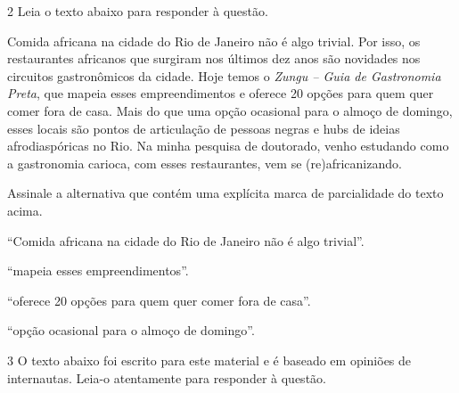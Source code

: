 \num{2} Leia o texto abaixo para responder à questão.

\begin{myquote}
Comida africana na cidade do Rio de Janeiro não é algo trivial. Por isso, os
restaurantes africanos que surgiram nos últimos dez anos são novidades nos
circuitos gastronômicos da cidade. Hoje temos o \textit{Zungu -- Guia de Gastronomia
Preta}, que mapeia esses empreendimentos e oferece 20 opções para quem quer
comer fora de casa. Mais do que uma opção ocasional para o almoço de domingo,
esses locais são pontos de articulação de pessoas negras e hubs de ideias
afrodiaspóricas no Rio. Na minha pesquisa de doutorado, venho estudando como a
gastronomia carioca, com esses restaurantes, vem se (re)africanizando.

\end{myquote}

Assinale a alternativa que contém uma explícita marca de parcialidade do texto acima.

\begin{escolha}

  \item ``Comida africana na cidade do Rio de Janeiro não é algo trivial''.
  
  \item ``mapeia esses empreendimentos''.
  
  \item ``oferece 20 opções para quem quer comer fora de casa''.
  
  \item ``opção ocasional para o almoço de domingo''.

\end{escolha}

\num{3} O texto abaixo foi escrito para este material e é baseado em opiniões
de internautas. Leia-o atentamente para responder à questão.

